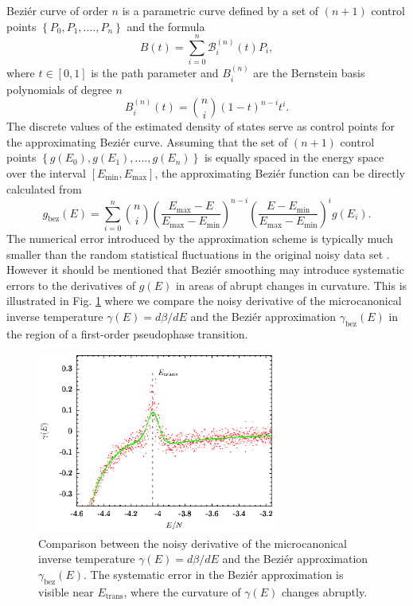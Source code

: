 \documentclass[12pt]{report}
\begin{document}
Bezi\'{e}r curve of order $n$ is a parametric curve defined by a set of $(n+1)$ control points $\left\lbrace P_{0},P_{1},....,P_{n}\right\rbrace$ and the formula 
%
\begin{equation}
\label{eq:beziereDefinition}
B(t) = \sum_{i=0}^{n}\mathcal{B}_{i}^{(n)}(t)P_{i},
\end{equation}
%
where $t \in [0,1]$ is the path parameter and ${B}_{i}^{(n)}$ are the Bernstein basis polynomials \cite{Lorentz1953} of degree $n$
%
\begin{equation}
\label{eq:BernsteinPoly}
{B}_{i}^{(n)}(t) = \binom{n}{i}(1-t)^{n-i}t^{i}.
\end{equation}
The discrete values of the estimated density of states serve as control points for the approximating Bezi\'{e}r curve. Assuming that the set of $(n+1)$ control points $\left\lbrace g(E_{0}),g(E_{1}),....,g(E_{n})\right\rbrace$ is equally spaced in the energy space over the interval $[E_{\mathrm{min}},E_{\mathrm{max}}]$, the approximating Bezi\'{e}r function can be directly calculated from
%
\begin{equation}
g_{\mathrm{bez}}(E) = \sum_{i=0}^{n} \binom{n}{i} \left(\frac{E_{\mathrm{max}} - E}{E_{\mathrm{max}} - E_{\mathrm{min}}} \right)^{n-i} \left(\frac{E - E_{\mathrm{min}}}{E_{\mathrm{max}} - E_{\mathrm{min}}} \right)^{i} 
g(E_{i}).
\end{equation}
%
The numerical error introduced by the approximation scheme is typically much smaller than the random statistical fluctuations in the original noisy data set \cite{Bachmann2014}. However it should be mentioned that Bezi\'{e}r smoothing may introduce systematic errors to the derivatives of $g(E)$ in areas of abrupt changes in curvature.  This is illustrated in Fig. \ref{fig:Bezier} where we compare the noisy derivative of the microcanonical inverse temperature $\gamma(E) = d\beta/dE$ and the Bezi\'{e}r approximation $\gamma_{\mathrm{bez}}(E)$ in the region of a first-order pseudophase transition. 
%
\begin{figure}
\center
\includegraphics[width = 0.7\textwidth]{chapter3Figs/bezierComparison.eps}
\caption{\label{fig:Bezier}%
Comparison between the noisy derivative of the microcanonical inverse temperature $\gamma(E) = d\beta/dE$ and the Bezi\'{e}r approximation $\gamma_{\mathrm{bez}}(E)$. The systematic error in the Bezi\'{e}r approximation is visible near $E_{\mathrm{trans}}$, where the curvature of $\gamma(E)$ changes abruptly.
}
\end{figure}
% 
\end{document}
